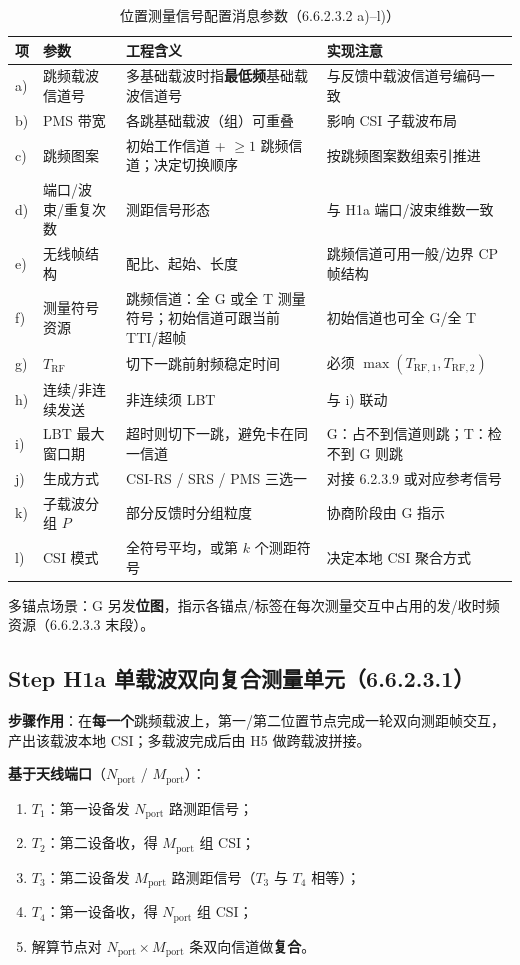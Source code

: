 \documentclass[11pt,a4paper]{ctexart}
\begin{document}
\begin{longtable}{L{0.8cm}L{3.2cm}L{4.5cm}L{4cm}}
\caption{位置测量信号配置消息参数（6.6.2.3.2 a)--l)）\label{tab:step112}} \\
\toprule
\textbf{项} & \textbf{参数} & \textbf{工程含义} & \textbf{实现注意} \\
\midrule
a) & 跳频载波信道号 & 多基础载波时指\textbf{最低频}基础载波信道号 & 与反馈中载波信道号编码一致 \\
b) & PMS 带宽 & 各跳基础载波（组）可重叠 & 影响 CSI 子载波布局 \\
c) & 跳频图案 & 初始工作信道 + $\ge 1$ 跳频信道；决定切换顺序 & 按跳频图案数组索引推进 \\
d) & 端口/波束/重复次数 & 测距信号形态 & 与 H1a 端口/波束维数一致 \\
e) & 无线帧结构 & 配比、起始、长度 & 跳频信道可用一般/边界 CP 帧结构 \\
f) & 测量符号资源 & 跳频信道：全 G 或全 T 测量符号；初始信道可跟当前 TTI/超帧 & 初始信道也可全 G/全 T \\
g) & $T_{\mathrm{RF}}$ & 切下一跳前射频稳定时间 & 必须 $\max(T_{\mathrm{RF},1},T_{\mathrm{RF},2})$ \\
h) & 连续/非连续发送 & 非连续须 LBT & 与 i) 联动 \\
i) & LBT 最大窗口期 & 超时则切下一跳，避免卡在同一信道 & G：占不到信道则跳；T：检不到 G 则跳 \\
j) & 生成方式 & CSI-RS / SRS / PMS 三选一 & 对接 6.2.3.9 或对应参考信号 \\
k) & 子载波分组 $P$ & 部分反馈时分组粒度 & 协商阶段由 G 指示 \\
l) & CSI 模式 & 全符号平均，或第 $k$ 个测距符号 & 决定本地 CSI 聚合方式 \\
\bottomrule
\end{longtable}

多锚点场景：G 另发\textbf{位图}，指示各锚点/标签在每次测量交互中占用的发/收时频资源（6.6.2.3.3 末段）。

\subsection{Step H1a 单载波双向复合测量单元（6.6.2.3.1）}

\textbf{步骤作用}：在\textbf{每一个}跳频载波上，第一/第二位置节点完成一轮双向测距帧交互，产出该载波本地 CSI；多载波完成后由 H5 做跨载波拼接。

\textbf{基于天线端口}（$N_{\mathrm{port}}$ / $M_{\mathrm{port}}$）：
\begin{enumerate}[nosep]
  \item $T_1$：第一设备发 $N_{\mathrm{port}}$ 路测距信号；
  \item $T_2$：第二设备收，得 $M_{\mathrm{port}}$ 组 CSI；
  \item $T_3$：第二设备发 $M_{\mathrm{port}}$ 路测距信号（$T_3$ 与 $T_4$ 相等）；
  \item $T_4$：第一设备收，得 $N_{\mathrm{port}}$ 组 CSI；
  \item 解算节点对 $N_{\mathrm{port}}\times M_{\mathrm{port}}$ 条双向信道做\textbf{复合}。
\end{enumerate}
\end{document}
